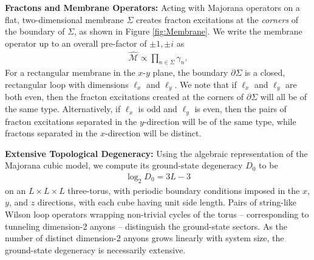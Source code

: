 \documentclass[aps,twocolumn,preprintnumbers,floatfix,showpacs,prx]{revtex4-1}
\begin{document}
{\bf Fractons and Membrane Operators:}
Acting with Majorana operators on a flat, two-dimensional membrane $\Sigma$ 
creates fracton excitations at the \emph{corners} of the boundary of $\Sigma$,
as shown in Figure \ref{fig:Membrane}.
We write the membrane operator up to an overall pre-factor of $\pm 1, \pm i$ as
\begin{align}
\hat{\mathcal{M}} \propto \prod_{n \in \Sigma}\gamma_{n}.
\end{align}
For a rectangular membrane in the $x$-$y$ plane,
the boundary $\partial\Sigma$ is a closed, rectangular loop with dimensions $\ell_{x}$ and $\ell_{y}$.
We note that if $\ell_{x}$ and $\ell_{y}$ are both even,
then the fracton excitations created at the corners of $\partial\Sigma$ will all be of the same type.
Alternatively, if $\ell_{x}$ is odd and $\ell_{y}$ is even,
then the pairs of fracton excitations separated in the $y$-direction will be of the same type,
while fractons separated in the $x$-direction will be distinct.  



{\bf Extensive Topological Degeneracy:}
Using the algebraic representation of the Majorana cubic model,
we compute its ground-state degeneracy $D_{0}$ to be 
\begin{align}
\log_{2}D_{0} = 3L-3
\end{align}
on an $L\times L\times L$ three-torus, with periodic boundary conditions imposed in the $x$, $y$, and $z$ directions, with each cube having unit side length. 
Pairs of string-like Wilson loop operators wrapping non-trivial cycles of the torus
-- corresponding to tunneling dimension-2 anyons -- 
distinguish the ground-state sectors.
As the number of distinct dimension-2 anyons grows linearly with system size,
the ground-state degeneracy is necessarily extensive.  
\end{document}
